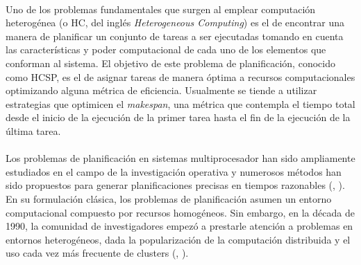 \newpage %

\paragraph{}Uno de los problemas fundamentales que surgen al emplear computación heterogénea (o HC, del inglés \textit{Heterogeneous Computing}) es el de encontrar una manera de planificar un conjunto de tareas a ser ejecutadas tomando en cuenta las características y poder computacional de cada uno de los elementos que conforman al sistema.
El objetivo de este problema de planificación, conocido como HCSP, es el de asignar tareas de manera óptima a recursos computacionales optimizando alguna métrica de eficiencia.
Usualmente se tiende a utilizar estrategias que optimicen el \textit{makespan}, una métrica que contempla el tiempo total desde el inicio de la ejecución de la primer tarea hasta el fin de la ejecución de la última tarea.

\paragraph{}Los problemas de planificación en sistemas multiprocesador han sido ampliamente estudiados en el campo de la investigación operativa y numerosos métodos han sido propuestos para generar planificaciones precisas en tiempos razonables (\citet{bib-rewini-scheduling}, \citet{bib-leung-handbook}).
En su formulación clásica, los problemas de planificación asumen un entorno computacional compuesto por recursos homogéneos.
Sin embargo, en la década de 1990, la comunidad de investigadores empezó a prestarle atención a problemas en entornos heterogéneos, dada la popularización de la computación distribuida y el uso cada vez más frecuente de clusters (\citet{bib-freund}, \citet{bib-eshaghian-heterogeneous}).

